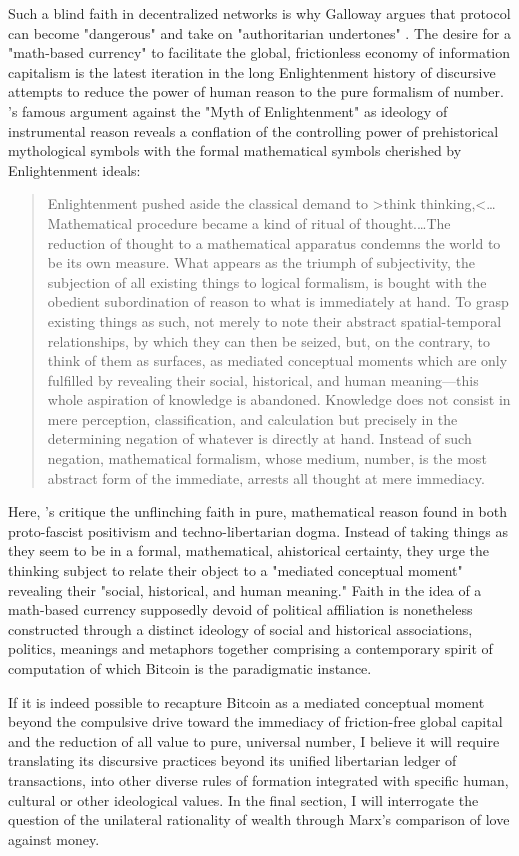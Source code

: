 Such a blind faith in decentralized networks is why Galloway argues that protocol can become "dangerous" and take on "authoritarian undertones" \autocite*[245]{Galloway2004-ac}. The desire for a "math-based currency" to facilitate the global, frictionless economy of information capitalism is the latest iteration in the long Enlightenment history of discursive attempts to reduce the power of human reason to the pure formalism of number. \citeauthor{HorkheimerDoE}'s famous argument against the "Myth of Enlightenment" as ideology of instrumental reason reveals a conflation of the controlling power of prehistorical mythological symbols with the formal mathematical symbols cherished by Enlightenment ideals:
\blockcquote[19--20]{HorkheimerDoE}{
  Enlightenment pushed aside the classical demand to >think thinking,<…Mathematical procedure became a kind of ritual of thought.…The reduction of thought to a mathematical apparatus condemns the world to be its own measure. What appears as the triumph of subjectivity, the subjection of all existing things to logical formalism, is bought with the obedient subordination of reason to what is immediately at hand. To grasp existing things as such, not merely to note their abstract spatial-temporal relationships, by which they can then be seized, but, on the contrary, to think of them as surfaces, as mediated conceptual moments which are only fulfilled by revealing their social, historical, and human meaning---this whole aspiration of knowledge is abandoned. Knowledge does not consist in mere perception, classification, and calculation but precisely in the determining negation of whatever is directly at hand. Instead of such negation, mathematical formalism, whose medium, number, is the most abstract form of the immediate, arrests all thought at mere immediacy.
}
Here, \citeauthor{HorkheimerDoE}'s critique the unflinching faith in pure, mathematical reason found in both proto-fascist positivism and techno-libertarian dogma. Instead of taking things as they seem to be in a formal, mathematical, ahistorical certainty, they urge the thinking subject to relate their object to a "mediated conceptual moment" revealing their "social, historical, and human meaning." Faith in the idea of a math-based currency supposedly devoid of political affiliation is nonetheless constructed through a distinct ideology of social and historical associations, politics, meanings and metaphors together comprising a contemporary spirit of computation of which Bitcoin is the paradigmatic instance.

If it is indeed possible to recapture Bitcoin as a mediated conceptual moment beyond the compulsive drive toward the immediacy of friction-free global capital and the reduction of all value to pure, universal number, I believe it will require translating its discursive practices beyond its unified libertarian ledger of transactions, into other diverse rules of formation integrated with specific human, cultural or other ideological values. In the final section, I will interrogate the question of the unilateral rationality of wealth through Marx's comparison of love against money.

